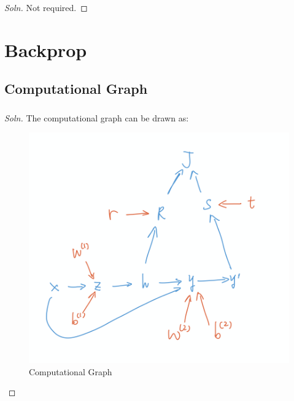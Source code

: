 \documentclass{article}
\begin{document}
	\subsubsection{}
	\begin{proof}[Soln]
		Not required.
	\end{proof}
	
	\section{Backprop}
	\subsection{Computational Graph}
	\subsubsection{}
	\begin{proof}[Soln]
		The computational graph can be drawn as:
		\begin{figure}[H]
			\center
			\includegraphics[width=\linewidth]{comp_graph.png}
			\caption{Computational Graph}
		\end{figure}
	\end{proof}
\end{document}
